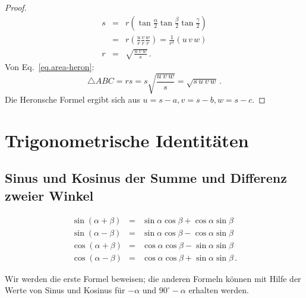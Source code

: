 \begin{proof}
\begin{eqnarray*}
s&=&r\left(\tan \frac{\alpha}{2}\tan \frac{\beta}{2}\tan \frac{\gamma}{2}\right)\\
&=&r\left(\frac{u}{r}\frac{v}{r}\frac{w}{r}\right)=\frac{1}{r^2}(u\,v\,w)\\
r&=&\sqrt{\displaystyle\frac{u\,v\,w}{s}}\,.
\end{eqnarray*}
Von Eq.~\ref{eq.area-heron}:
\[
\triangle ABC=rs=s\sqrt{\displaystyle\frac{u\,v\,w}{s}}=\sqrt{s\,u\,v\,w}\,.
\]
Die Heronsche Formel ergibt sich aus $u=s-a, v=s-b, w=s-c$.
\end{proof}


\section{Trigonometrische Identitäten}\label{a.trig-identities}


\subsection{Sinus und Kosinus der Summe und Differenz zweier Winkel} \label{s.sum-of-trig}

\begin{theorem}\label{thm.sum-of-trig}
\begin{eqnarray*}
\sin(\alpha+\beta) &=& \sin\alpha\cos\beta + \cos\alpha\sin\beta\\
\sin(\alpha-\beta) &=& \sin\alpha\cos\beta - \cos\alpha\sin\beta\\
\cos(\alpha+\beta) &=& \cos\alpha\cos\beta - \sin\alpha\sin\beta\\
\cos(\alpha-\beta) &=& \cos\alpha\cos\beta + \sin\alpha\sin\beta\,.
\end{eqnarray*}
\end{theorem}
Wir werden die erste Formel beweisen; die anderen Formeln können mit Hilfe der Werte von Sinus und Kosinus für $-\alpha$ und $90^\circ-\alpha$ erhalten werden.

